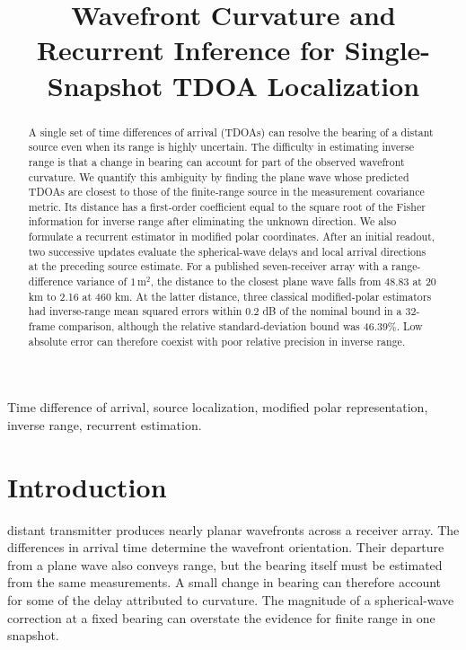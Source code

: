 \documentclass[journal]{IEEEtran}
\begin{document}
\title{Wavefront Curvature and Recurrent Inference for Single-Snapshot TDOA Localization}
\author{}
\maketitle

\begin{abstract}
A single set of time differences of arrival (TDOAs) can resolve the bearing of a distant source even when its range is highly uncertain. The difficulty in estimating inverse range is that a change in bearing can account for part of the observed wavefront curvature. We quantify this ambiguity by finding the plane wave whose predicted TDOAs are closest to those of the finite-range source in the measurement covariance metric. Its distance has a first-order coefficient equal to the square root of the Fisher information for inverse range after eliminating the unknown direction. We also formulate a recurrent estimator in modified polar coordinates. After an initial readout, two successive updates evaluate the spherical-wave delays and local arrival directions at the preceding source estimate. For a published seven-receiver array with a range-difference variance of \(1\,\mathrm{m}^2\), the distance to the closest plane wave falls from 48.83 at 20 km to 2.16 at 460 km. At the latter distance, three classical modified-polar estimators had inverse-range mean squared errors within 0.2 dB of the nominal bound in a 32-frame comparison, although the relative standard-deviation bound was 46.39\%. Low absolute error can therefore coexist with poor relative precision in inverse range.
\end{abstract}

\begin{IEEEkeywords}
Time difference of arrival, source localization, modified polar representation, inverse range, recurrent estimation.
\end{IEEEkeywords}

\section{Introduction}
 distant transmitter produces nearly planar wavefronts across a receiver array. The differences in arrival time determine the wavefront orientation. Their departure from a plane wave also conveys range, but the bearing itself must be estimated from the same measurements. A small change in bearing can therefore account for some of the delay attributed to curvature. The magnitude of a spherical-wave correction at a fixed bearing can overstate the evidence for finite range in one snapshot.
\end{document}
